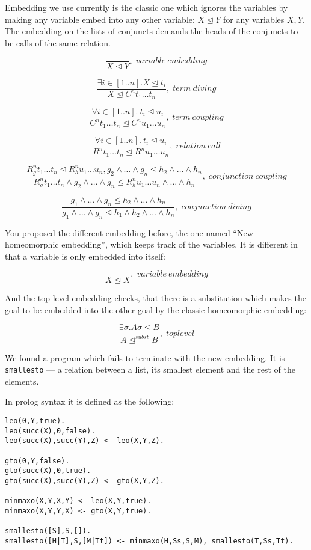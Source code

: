 \documentclass{llncs}
\newcommand{\crule}[3]{\frac{#1}{#2},\;{#3}}
\begin{document}
Embedding we use currently is the classic one which ignores the variables by making any variable embed into any other variable: $X \trianglelefteq Y$ for any variables $X, Y$. The embedding on the lists of conjuncts demands the heads of the conjuncts to be calls of the same relation. 

$$
\crule{}
      {X \trianglelefteq Y}
      {variable \ embedding}
$$

$$
\crule{\exists i \in [1..n]. X \trianglelefteq t_i}
      {X \trianglelefteq C^n t_1 \dots t_n}
      {term \ diving}
$$

$$
\crule{\forall i \in [1..n]. \ t_i \trianglelefteq u_i}
      {C^n t_1 \dots t_n \trianglelefteq C^n u_1 \dots u_n}
      {term \ coupling}
$$

$$
\crule{\forall i \in [1..n]. \ t_i \trianglelefteq u_i}
      {R^n t_1 \dots t_n \trianglelefteq R^n u_1 \dots u_n}
      {relation \ call}
$$

$$
\crule{R_g^n t_1 \dots t_n \trianglelefteq R_h^n u_1 \dots u_n, g_2 \wedge \dots \wedge g_n \trianglelefteq h_2 \wedge \dots \wedge h_n}
      {R_g^n t_1 \dots t_n \wedge g_2 \wedge \dots \wedge g_n \trianglelefteq R_h^n u_1 \dots u_n \wedge \dots \wedge h_n}
      {conjunction \ coupling}
$$

$$
\crule{g_1 \wedge \dots \wedge g_n \trianglelefteq h_2 \wedge \dots \wedge h_n}
      {g_1 \wedge \dots \wedge g_n \trianglelefteq h_1 \wedge h_2 \wedge \dots \wedge h_n}
      {conjunction \ diving}
$$

You proposed the different embedding before, the one named ``New homeomorphic embedding'', which keeps track of the variables. It is different in that a variable is only embedded into itself:

$$
\crule{}
      {X \trianglelefteq X}
      {variable \ embedding}
$$

And the top-level embedding checks, that there is a substitution which makes the goal to be embedded into the other goal by the classic homeomorphic embedding: 

$$
\crule{\exists \sigma. A \sigma \trianglelefteq B}
      {A {\trianglelefteq}^{subst} B}
      {toplevel}
$$

We found a program which fails to terminate with the new embedding. It is \verb!smallesto! --- a relation between a list, its smallest element and the rest of the elements. 

In prolog syntax it is defined as the following: 

\begin{verbatim}
leo(0,Y,true).
leo(succ(X),0,false).
leo(succ(X),succ(Y),Z) <- leo(X,Y,Z).

gto(0,Y,false).
gto(succ(X),0,true).
gto(succ(X),succ(Y),Z) <- gto(X,Y,Z).

minmaxo(X,Y,X,Y) <- leo(X,Y,true).
minmaxo(X,Y,Y,X) <- gto(X,Y,true).

smallesto([S],S,[]).
smallesto([H|T],S,[M|Tt]) <- minmaxo(H,Ss,S,M), smallesto(T,Ss,Tt).
\end{verbatim}
\end{document}
